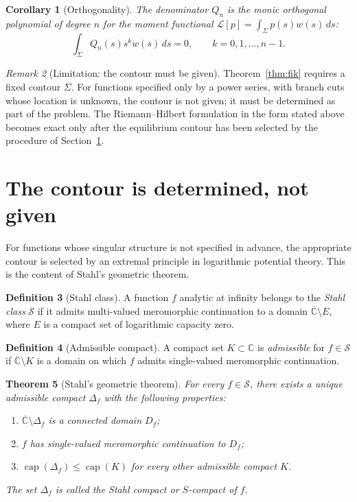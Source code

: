 \documentclass[11pt]{article}
\newtheorem{theorem}{Theorem}[section]
\newtheorem{corollary}[theorem]{Corollary}
\theoremstyle{definition}
\newtheorem{definition}[theorem]{Definition}
\theoremstyle{remark}
\newtheorem{remark}[theorem]{Remark}
\DeclareMathOperator{\capa}{cap}
\begin{document}
\begin{corollary}[Orthogonality]
\label{cor:orthogonality}
The denominator $Q_{n}$ is the monic orthogonal polynomial of degree $n$ for the moment functional $\mathcal{L}[p]=\int_{\Sigma}p(s)w(s)\,ds$:
\begin{equation}
\int_{\Sigma}Q_{n}(s)s^{k}w(s)\,ds=0,
\qquad k=0,1,\dots,n-1.
\label{eq:orthogonality}
\end{equation}
\end{corollary}

\begin{remark}[Limitation: the contour must be given]
\label{rem:fixed-contour}
Theorem~\ref{thm:fik} requires a fixed contour $\Sigma$. For functions specified only by a power series, with branch cuts whose location is unknown, the contour is not given; it must be determined as part of the problem. The Riemann--Hilbert formulation in the form stated above becomes exact only after the equilibrium contour has been selected by the procedure of Section~\ref{sec:stahl}.
\end{remark}

\section{The contour is determined, not given}
\label{sec:stahl}

For functions whose singular structure is not specified in advance, the appropriate contour is selected by an extremal principle in logarithmic potential theory. This is the content of Stahl's geometric theorem.

\begin{definition}[Stahl class]
\label{def:stahl-class}
A function $f$ analytic at infinity belongs to the \emph{Stahl class} $\mathcal{S}$ if it admits multi-valued meromorphic continuation to a domain $\overline{\mathbb{C}}\setminus E$, where $E$ is a compact set of logarithmic capacity zero.
\end{definition}

\begin{definition}[Admissible compact]
\label{def:admissible}
A compact set $K\subset\mathbb{C}$ is \emph{admissible} for $f\in\mathcal{S}$ if $\overline{\mathbb{C}}\setminus K$ is a domain on which $f$ admits single-valued meromorphic continuation.
\end{definition}

\begin{theorem}[Stahl's geometric theorem]
\label{thm:stahl-geometric}
For every $f\in\mathcal{S}$, there exists a unique admissible compact $\Delta_{f}$ with the following properties:
\begin{enumerate}[label=(\roman*)]
\item $\overline{\mathbb{C}}\setminus\Delta_{f}$ is a connected domain $D_{f}$;
\item $f$ has single-valued meromorphic continuation to $D_{f}$;
\item $\capa(\Delta_{f})\le\capa(K)$ for every other admissible compact $K$.
\end{enumerate}
The set $\Delta_{f}$ is called the \emph{Stahl compact} or \emph{$S$-compact} of $f$.
\end{theorem}
\end{document}
